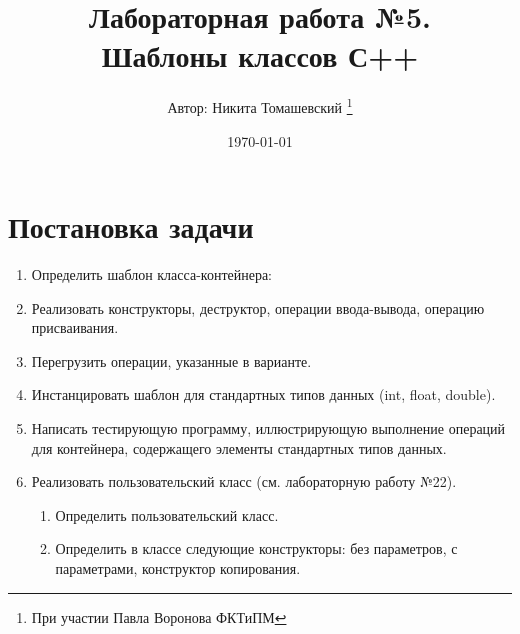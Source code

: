 

\title{Лабораторная работа №5. \\
    \large Шаблоны классов С++}

\author{Автор: Никита Томашевский \thanks{При участии Павла Воронова ФКТиПМ}}
\date{\today}


    \maketitle\newpage
    \tableofcontents\newpage
    \section{Постановка задачи}
    \begin{enumerate}
        \item Определить шаблон класса-контейнера:
        \item Реализовать конструкторы, деструктор, операции ввода-вывода, операцию присваивания.
        \item Перегрузить операции, указанные в варианте.
        \item Инстанцировать шаблон для стандартных типов данных (int, float, double).
        \item Написать тестирующую программу, иллюстрирующую выполнение операций для контейнера, содержащего элементы стандартных типов данных.
        \item Реализовать пользовательский класс (см. лабораторную работу №22).
        \begin{enumerate}
            \item Определить пользовательский класс.
            \item Определить в классе следующие конструкторы: без параметров, с параметрами, конструктор копирования.

\end{enumerate}
\end{enumerate}
